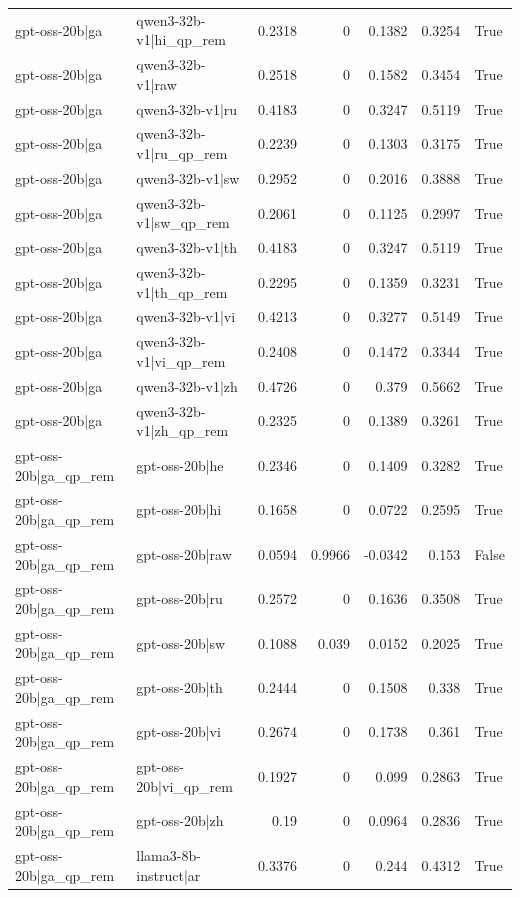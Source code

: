 \begin{table}
\begin{tabular}{l l r r r r l}
gpt-oss-20b|ga & qwen3-32b-v1|hi_qp_rem & 0.2318 & 0 & 0.1382 & 0.3254 & True \\
gpt-oss-20b|ga & qwen3-32b-v1|raw & 0.2518 & 0 & 0.1582 & 0.3454 & True \\
gpt-oss-20b|ga & qwen3-32b-v1|ru & 0.4183 & 0 & 0.3247 & 0.5119 & True \\
gpt-oss-20b|ga & qwen3-32b-v1|ru_qp_rem & 0.2239 & 0 & 0.1303 & 0.3175 & True \\
gpt-oss-20b|ga & qwen3-32b-v1|sw & 0.2952 & 0 & 0.2016 & 0.3888 & True \\
gpt-oss-20b|ga & qwen3-32b-v1|sw_qp_rem & 0.2061 & 0 & 0.1125 & 0.2997 & True \\
gpt-oss-20b|ga & qwen3-32b-v1|th & 0.4183 & 0 & 0.3247 & 0.5119 & True \\
gpt-oss-20b|ga & qwen3-32b-v1|th_qp_rem & 0.2295 & 0 & 0.1359 & 0.3231 & True \\
gpt-oss-20b|ga & qwen3-32b-v1|vi & 0.4213 & 0 & 0.3277 & 0.5149 & True \\
gpt-oss-20b|ga & qwen3-32b-v1|vi_qp_rem & 0.2408 & 0 & 0.1472 & 0.3344 & True \\
gpt-oss-20b|ga & qwen3-32b-v1|zh & 0.4726 & 0 & 0.379 & 0.5662 & True \\
gpt-oss-20b|ga & qwen3-32b-v1|zh_qp_rem & 0.2325 & 0 & 0.1389 & 0.3261 & True \\
gpt-oss-20b|ga_qp_rem & gpt-oss-20b|he & 0.2346 & 0 & 0.1409 & 0.3282 & True \\
gpt-oss-20b|ga_qp_rem & gpt-oss-20b|hi & 0.1658 & 0 & 0.0722 & 0.2595 & True \\
gpt-oss-20b|ga_qp_rem & gpt-oss-20b|raw & 0.0594 & 0.9966 & -0.0342 & 0.153 & False \\
gpt-oss-20b|ga_qp_rem & gpt-oss-20b|ru & 0.2572 & 0 & 0.1636 & 0.3508 & True \\
gpt-oss-20b|ga_qp_rem & gpt-oss-20b|sw & 0.1088 & 0.039 & 0.0152 & 0.2025 & True \\
gpt-oss-20b|ga_qp_rem & gpt-oss-20b|th & 0.2444 & 0 & 0.1508 & 0.338 & True \\
gpt-oss-20b|ga_qp_rem & gpt-oss-20b|vi & 0.2674 & 0 & 0.1738 & 0.361 & True \\
gpt-oss-20b|ga_qp_rem & gpt-oss-20b|vi_qp_rem & 0.1927 & 0 & 0.099 & 0.2863 & True \\
gpt-oss-20b|ga_qp_rem & gpt-oss-20b|zh & 0.19 & 0 & 0.0964 & 0.2836 & True \\
gpt-oss-20b|ga_qp_rem & llama3-8b-instruct|ar & 0.3376 & 0 & 0.244 & 0.4312 & True \\

\end{tabular}
\end{table}
